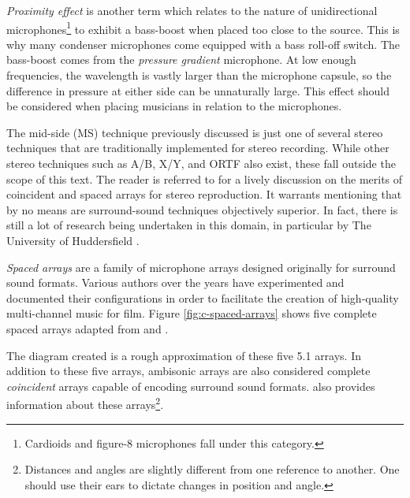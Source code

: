 \textit{Proximity effect} is another term which relates to the nature of unidirectional microphones\footnote{Cardioids and figure-8 microphones fall under this category.} to exhibit a bass-boost when placed too close to the source. This is why many condenser microphones come equipped with a bass roll-off switch. The bass-boost comes from the \textit{pressure gradient} microphone. At low enough frequencies, the wavelength is vastly larger than the microphone capsule, so the difference in pressure at either side can be unnaturally large. This effect should be considered when placing musicians in relation to the microphones.

The mid-side (MS) technique previously discussed is just one of several stereo techniques that are traditionally implemented for stereo recording. While other stereo techniques such as A/B, X/Y, and ORTF also exist, these fall outside the scope of this text. The reader is referred to \cite{lipshitz1986stereo} for a lively discussion on the merits of coincident and spaced arrays for stereo reproduction. It warrants mentioning that by no means are surround-sound techniques objectively superior. In fact, there is still a lot of research being undertaken in this domain, in particular by The University of Huddersfield \cite{lee3d}. 

\textit{Spaced arrays} are a family of microphone arrays designed originally for surround sound formats. Various authors over the years have experimented and documented their configurations in order to facilitate the creation of high-quality multi-channel music for film. Figure \ref{fig:c-spaced-arrays} shows five complete spaced arrays adapted from \cite{hacihabiboglu2017perceptual} and \cite{politis2016microphone}. 

The diagram created is a rough approximation of these five 5.1 arrays. In addition to these five arrays, ambisonic arrays are also considered complete \textit{coincident} arrays capable of encoding surround sound formats. \cite{Immersiv9:online} also provides information about these arrays\footnote{Distances and angles are slightly different from one reference to another. One should use their ears to dictate changes in position and angle.}.

